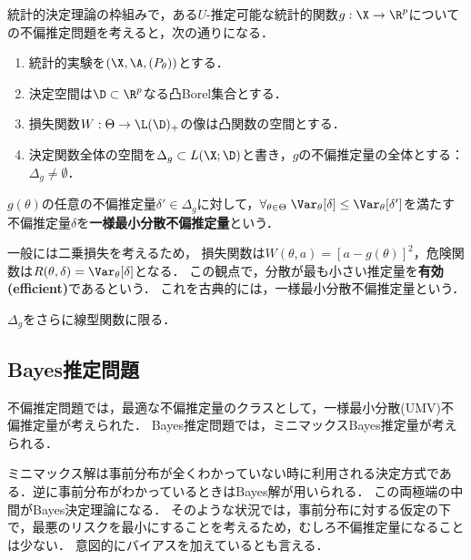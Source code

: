 \documentclass[uplatex,dvipdfmx]{jsreport}
\begin{document}
\begin{problem}[不偏推定問題]
    統計的決定理論の枠組みで，ある$U$-推定可能な統計的関数$g:\X\to\R^p$についての不偏推定問題を考えると，次の通りになる．
    \begin{enumerate}
        \item 統計的実験を$(\X,\A,(P_\theta))$とする．
        \item 決定空間は$\D\subset\R^p$なる凸Borel集合とする．
        \item 損失関数$W:\Theta\to\L(\D)_+$の像は凸関数の空間とする．
        \item 決定関数全体の空間を$\Delta_g\subset L(\X;\D)$と書き，$g$の不偏推定量の全体とする：$\Delta_g\ne\emptyset$．
    \end{enumerate}
\end{problem}

\begin{definition}
    $g(\theta)$の任意の不偏推定量$\delta'\in\Delta_g$に対して，$\forall_{\theta\in\Theta}\;\Var_\theta[\delta]\le\Var_\theta[\delta']$を満たす不偏推定量$\delta$を\textbf{一様最小分散不偏推定量}という．
\end{definition}
\begin{remarks}
    一般には二乗損失を考えるため，
    損失関数は$W(\theta,a)=[a-g(\theta)]^2$，危険関数は$R(\theta,\delta)=\Var_\theta[\delta]$となる．
    この観点で，分散が最も小さい推定量を\textbf{有効(efficient)}であるという．
    これを古典的には，一様最小分散不偏推定量という．
\end{remarks}

\begin{definition}
    $\Delta_g$をさらに線型関数に限る．
\end{definition}

\subsection{Bayes推定問題}

\begin{tcolorbox}[colframe=ForestGreen, colback=ForestGreen!10!white,breakable,colbacktitle=ForestGreen!40!white,coltitle=black,fonttitle=\bfseries\sffamily,
title=]
    不偏推定問題では，最適な不偏推定量のクラスとして，一様最小分散(UMV)不偏推定量が考えられた．
    Bayes推定問題では，ミニマックスBayes推定量が考えられる．

    ミニマックス解は事前分布が全くわかっていない時に利用される決定方式である．逆に事前分布がわかっているときはBayes解が用いられる．
    この両極端の中間がBayes決定理論になる．
    そのような状況では，事前分布に対する仮定の下で，最悪のリスクを最小にすることを考えるため，むしろ不偏推定量になることは少ない．
    意図的にバイアスを加えているとも言える．
\end{tcolorbox}
\end{document}
